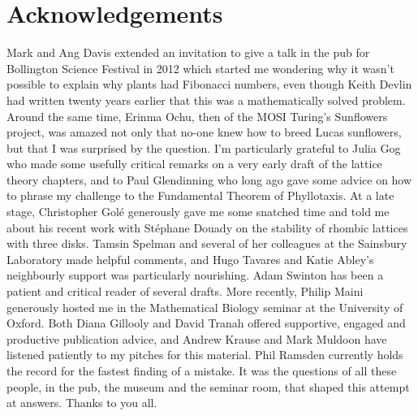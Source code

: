 


\chapter*{Acknowledgements}
Mark and Ang Davis extended an invitation to give a talk in the pub for Bollington Science Festival in 2012 which started me wondering why it wasn't possible to explain why plants had Fibonacci numbers, even though Keith Devlin had written twenty years earlier that this was a mathematically solved problem. Around the same time, Erinma Ochu, then of the MOSI Turing's Sunflowers project, was amazed not only that no-one knew how to breed Lucas sunflowers, but that I was surprised by the question.  
I'm particularly grateful to Julia Gog who made some usefully critical remarks on a very early draft of the lattice theory chapters, and to Paul Glendinning who long ago gave some advice on how to phrase my challenge to the Fundamental Theorem of Phyllotaxis.
At a late stage, Christopher Golé generously gave me some snatched time and told me about his recent work with Stéphane Douady on the stability of rhombic lattices with three disks. Tamsin Spelman and several of her colleagues at the Sainsbury Laboratory made helpful comments, and Hugo Tavares and Katie Abley's neighbourly support was particularly nourishing. Adam Swinton has been a patient and critical reader of several drafts.  More recently, Philip Maini generously hosted me in the Mathematical Biology seminar at the University of Oxford. Both Diana Gillooly and David Tranah offered supportive, engaged and productive publication advice, and Andrew Krause and Mark Muldoon have listened patiently to my pitches for this material. Phil Ramsden currently holds the record for the fastest finding of a mistake. 
It was the questions of all these people, in the pub, the museum and the seminar room, that shaped this attempt at answers.  Thanks to you all. 

